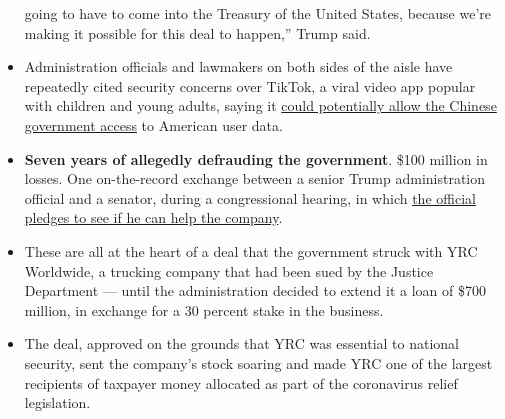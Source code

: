 \begin{itemize}
  going to have to come into the Treasury of the United States, because
  we're making it possible for this deal to happen,'' Trump said.
\item
  Administration officials and lawmakers on both sides of the aisle have
  repeatedly cited security concerns over TikTok, a viral video app
  popular with children and young adults, saying it
  \href{https://www.nytimes.com/2020/08/03/technology/tiktok-microsoft-tweens.html}{could
  potentially allow the Chinese government access} to American user
  data.
\item
  \textbf{Seven years of allegedly defrauding the government}. \$100
  million in losses. One on-the-record exchange between a senior Trump
  administration official and a senator, during a congressional hearing,
  in which
  \href{https://www.nytimes.com/2020/08/03/us/politics/yrc-coronavirus-relief-funds.html}{the
  official pledges to see if he can help the company}.
\item
  These are all at the heart of a deal that the government struck with
  YRC Worldwide, a trucking company that had been sued by the Justice
  Department --- until the administration decided to extend it a loan of
  \$700 million, in exchange for a 30 percent stake in the business.
\item
  The deal, approved on the grounds that YRC was essential to national
  security, sent the company's stock soaring and made YRC one of the
  largest recipients of taxpayer money allocated as part of the
  coronavirus relief legislation.
\end{itemize}

